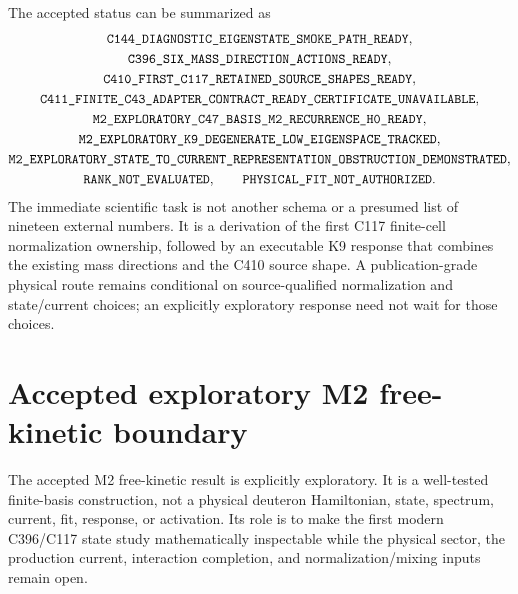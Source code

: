 \documentclass[11pt,oneside]{book}
\newcommand{\statuscode}[1]{\text{\ttfamily\detokenize{#1}}}
\begin{document}
The accepted status can be summarized as
\begin{equation}
 \begin{gathered}
 \statuscode{C144_DIAGNOSTIC_EIGENSTATE_SMOKE_PATH_READY},\\
 \statuscode{C396_SIX_MASS_DIRECTION_ACTIONS_READY},\\
 \statuscode{C410_FIRST_C117_RETAINED_SOURCE_SHAPES_READY},\\
 \statuscode{C411_FINITE_C43_ADAPTER_CONTRACT_READY_CERTIFICATE_UNAVAILABLE},\\
 \statuscode{M2_EXPLORATORY_C47_BASIS_M2_RECURRENCE_H0_READY},\\
 \statuscode{M2_EXPLORATORY_K9_DEGENERATE_LOW_EIGENSPACE_TRACKED},\\
 \statuscode{M2_EXPLORATORY_STATE_TO_CURRENT_REPRESENTATION_OBSTRUCTION_DEMONSTRATED},\\
 \statuscode{RANK_NOT_EVALUATED},\qquad
 \statuscode{PHYSICAL_FIT_NOT_AUTHORIZED}.
 \end{gathered}
 \label{eq:accepted-c411-status}
\end{equation}
The immediate scientific task is not another schema or a presumed list of nineteen external numbers.  It is a derivation of the first C117 finite-cell normalization ownership, followed by an executable K9 response that combines the existing mass directions and the C410 source shape.  A publication-grade physical route remains conditional on source-qualified normalization and state/current choices; an explicitly exploratory response need not wait for those choices.

\section{Accepted exploratory M2 free-kinetic boundary}
\label{sec:m2-exploratory-h0}

The accepted M2 free-kinetic result is explicitly exploratory. It is a
well-tested finite-basis construction, not a physical deuteron Hamiltonian,
state, spectrum, current, fit, response, or activation. Its role is to make
the first modern C396/C117 state study mathematically inspectable while the
physical sector, the production current, interaction completion, and
normalization/mixing inputs remain open.
\end{document}
